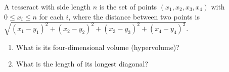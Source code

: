 A tesseract with side length $n$ is the set of points $(x_1,x_2,x_3,x_4)$ with $0\le x_i\le n$ for each $i$, where the distance between two points is $\sqrt{(x_1-y_1)^2+(x_2-y_2)^2+(x_3-y_3)^2+(x_4-y_4)^2}$.
\begin{enumerate}
\item[(a)] What is its four-dimensional volume (hypervolume)?
\item[(b)] What is the length of its longest diagonal?
\end{enumerate}
